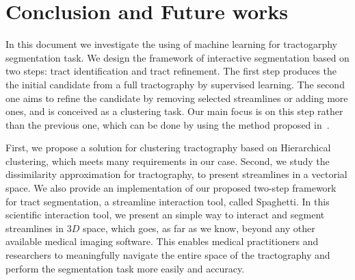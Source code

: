 \section{Conclusion and Future works}
\label{sec:conclusion}
In this document we investigate the using of machine learning %
for tractogarphy segmentation task.
We design the framework of interactive segmentation based on two steps: tract identification and tract refinement. 
The first step produces the the initial candidate 
from a full tractography by supervised learning. The second one aims to refine the candidate by removing selected streamlines or adding more 
ones, and is conceived as a clustering task. Our main focus is on this step rather than the previous one, which can be done by using the method proposed in~\cite{olivetti2011supervised}. 

First, we propose a solution for clustering tractography based on Hierarchical clustering, which meets many requirements in our case. Second, we study the dissimilarity approximation for tractography, to present streamlines in a vectorial space.
We also provide an implementation of our proposed two-step framework for tract segmentation, a streamline interaction tool, called Spaghetti. In this scientific interaction tool, we present an simple way to interact and segment streamlines in $3D$ space, which goes, as far as we know, beyond any other available medical imaging software.
This enables medical practitioners and researchers to meaningfully navigate the entire space of the tractography and perform the segmentation task more easily and accuracy.

